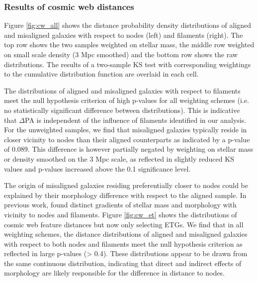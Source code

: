 \subsubsection{Results of cosmic web distances} \label{sec:cw_res}
Figure \ref{fig:cw_all} shows the distance probability density distributions of aligned and misaligned galaxies with respect to nodes (left) and filaments (right). The top row shows the two samples weighted on stellar mass, the middle row weighted on small scale density (3 Mpc smoothed) and the bottom row shows the raw distributions. The results of a two-sample KS test with corresponding weightings to the cumulative distribution function are overlaid in each cell. 

The distributions of aligned and misaligned galaxies with respect to filaments meet the null hypothesis criterion of high p-values for all weighting schemes (i.e. no statistically significant difference between distributions). This is indicative that $\Delta$PA is independent of the influence of filaments identified in our analysis. For the unweighted samples, we find that misaligned galaxies typically reside in closer vicinity to nodes than their aligned counterparts as indicated by a p-value of 0.089. This difference is however partially negated by weighting on stellar mass or density smoothed on the 3 Mpc scale, as reflected in slightly reduced KS values and p-values increased above the 0.1 significance level.

The origin of misaligned galaxies residing preferentially closer to nodes could be explained by their morphology difference with respect to the aligned sample. In previous work, \citet{kraljic2018} found distinct gradients of stellar mass and morphology with vicinity to nodes and filaments. Figure \ref{fig:cw_et} shows the distributions of cosmic web feature distances but now only selecting ETGs. We find that in all weighting schemes, the distance distributions of aligned and misaligned galaxies with respect to both nodes and filaments meet the null hypothesis criterion as reflected in large p-values (> 0.4). These distributions appear to be drawn from the same continuous distribution, indicating that direct and indirect effects of morphology are likely responsible for the difference in distance to nodes. 

